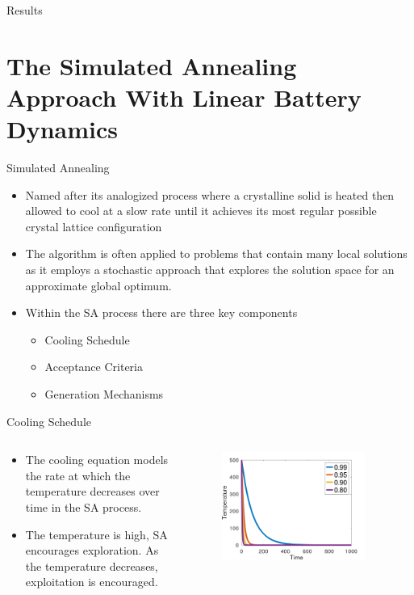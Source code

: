 \documentclass[aspectratio=169]{beamer}
\begin{document}
\begin{frame}[label={sec:org4ee59dd}]{Results}
\section{The Simulated Annealing Approach With Linear Battery Dynamics}
\label{sec:org9b6f730}
\begin{frame}[label={sec:org7c50f9d}]{Simulated Annealing}
\begin{itemize}
\item Named after its analogized process where a crystalline solid is heated then allowed to cool at a slow rate until it achieves its most regular possible crystal lattice configuration
\item The algorithm is often applied to problems that contain many local solutions as it employs a stochastic approach that explores the solution space for an approximate global optimum.
\item Within the SA process there are three key components
\begin{itemize}
\item Cooling Schedule
\item Acceptance Criteria
\item Generation Mechanisms
\end{itemize}
\end{itemize}
\end{frame}
\begin{frame}[label={sec:org3b3b6e3}]{Cooling Schedule}
\begin{columns}
\begin{column}{0.5\columnwidth}
\begin{itemize}
\item The cooling equation models the rate at which the temperature decreases over time in the SA process.
\item The temperature is high, SA encourages exploration. As the temperature decreases, exploitation is encouraged.
\end{itemize}
\end{column}

\begin{column}{0.5\columnwidth}
\begin{figure}[t!]
  \centering \includegraphics[width=0.9\textwidth]{img/geometric.png}
  \label{fig:geometric}
\end{figure}


\end{column}
\end{columns}
\end{frame}
\end{frame}
\end{document}

